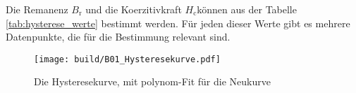 Die Remanenz $B_\text{r}$ und die Koerzitivkraft $H_\text{c}$können aus der Tabelle \ref{tab:hysterese_werte} bestimmt werden.
Für jeden dieser Werte gibt es mehrere Datenpunkte, die für die Bestimmung relevant sind. 


\begin{figure}
    \texttt{[image: build/B01\_Hysteresekurve.pdf]}
    \caption{Die Hysteresekurve, mit polynom-Fit für die Neukurve}
    \label{fig:Hysteresekurve_werte}
\end{figure}

